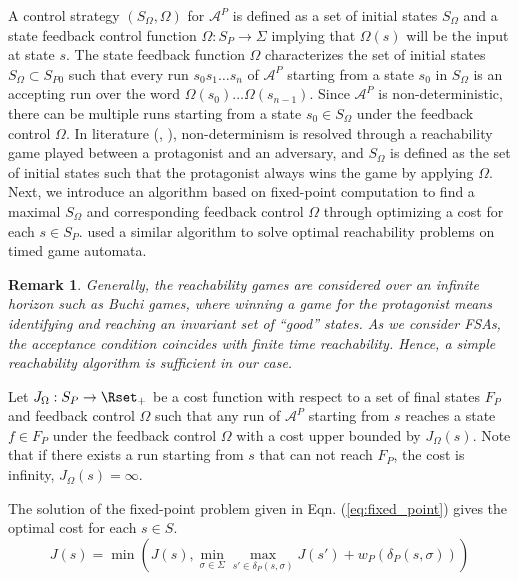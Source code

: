 \documentclass{ifacconf}
\newtheorem{remark}{Remark}
\newcommand{\AUTOMATON}{\ensuremath{\mathcal{A}}}
\begin{document}
\newcommand{\ControlSet}{{SC}}
\newcommand{\StateCost}{J}


A control strategy $(S_\Omega, \Omega)$ for $\AUTOMATON^P$ is defined as a set of initial states $S_\Omega$ and a state feedback control function $\Omega : S_P \longrightarrow \Sigma$ implying that $\Omega(s)$ will be the input at state $s$. The state feedback function $\Omega$ characterizes the set of initial states $S_{\Omega} \subset S_{P0}$ such that every run $s_0s_1\ldots s_n$ of $\AUTOMATON^P$ starting from a state $s_0$ in $S_{\Omega}$ is an accepting run over the word $\Omega(s_0)\ldots \Omega(s_{n-1})$.
Since $\AUTOMATON^P$ is non-deterministic, there can be multiple runs starting from a state $s_0 \in S_\Omega$ under the feedback control $\Omega$. In literature (\cite{Kloetzer:2008NonDet}, \cite{Wolfgang2002}), non-determinism is resolved through a reachability game played between a protagonist and an adversary, and  $S_\Omega$ is defined as the set of initial states such that the protagonist always wins the game by applying $\Omega$. 
Next, we introduce an algorithm based on fixed-point computation to find a maximal $S_\Omega$ and corresponding feedback control $\Omega$ through optimizing a cost for each $s \in S_P$. \cite{Asarin:1999} used a similar algorithm to solve optimal reachability problems on timed game automata. 

\begin{remark}
Generally, the reachability games are considered over an infinite horizon such as Buchi games, where winning a game for the protagonist means identifying and reaching an invariant set of ``good'' states.  
As we consider FSAs, the acceptance condition coincides with finite time reachability. 
Hence, a simple reachability algorithm is sufficient in our case.
\end{remark}

Let $\StateCost_{\Omega}:S_P \rightarrow \Rset_+$ be a cost function with respect to a set of final states $F_P$ and feedback control $\Omega$ such that any run of $\AUTOMATON^P$ starting from $s$ reaches a state $f \in F_P$ under the feedback control $\Omega$ with a cost upper bounded by  $\StateCost_{\Omega}(s)$. Note that if there exists a run starting from $s$ that can not reach $F_P$, the cost is infinity, $\StateCost_{\Omega}(s) = \infty$.

The solution of the fixed-point problem given in Eqn. (\ref{eq:fixed_point}) gives the optimal cost for each $s\in S$.
	\begin{equation}\label{eq:fixed_point}
		\StateCost(s) = \min(\StateCost(s) ,   \min_{\sigma \in \Sigma} \max_{s' \in \delta_P(s,\sigma)} \StateCost(s') + w_P(\delta_P(s,\sigma)) )
	\end{equation}
\end{document}
